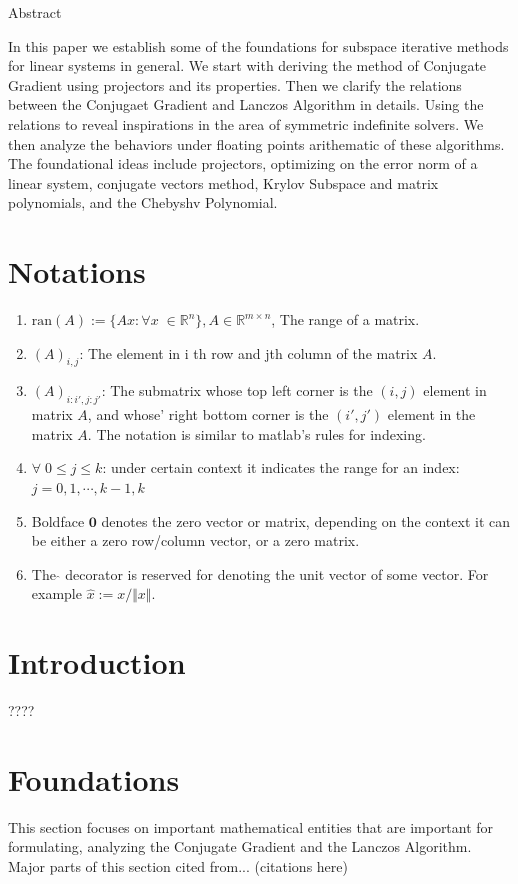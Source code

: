\documentclass[]{article}
\theoremstyle{definition}
\begin{document}
\tableofcontents
\newpage
\begin{center}
    Abstract
\end{center}
In this paper we establish some of the foundations for subspace iterative methods for linear systems in general. We start with deriving the method of Conjugate Gradient using projectors and its properties. Then we clarify the relations between the Conjugaet Gradient and Lanczos Algorithm in details. Using the relations to reveal inspirations in the area of symmetric indefinite solvers. We then analyze the behaviors under floating points arithematic of these algorithms. The foundational ideas include projectors, optimizing on the error norm of a linear system, conjugate vectors method, Krylov Subspace and matrix polynomials, and the Chebyshv Polynomial. 


\section{Notations}
\begin{enumerate}
    \item $\text{ran}(A):=\{Ax :\forall x \; \in \mathbb R^n\}, A \in \mathbb R^{m\times n}$, The range of a matrix. 
    \item $(A)_{i, j}$: The element in i th row and jth column of the matrix $A$.
    \item $(A)_{i:i', j:j'}$: The submatrix whose top left corner is the $(i, j)$ element in matrix $A$, and whose' right bottom corner is the $(i', j ')$ element in the matrix $A$. The notation is similar to matlab's rules for indexing. 
    \item $\forall\; 0\le j \le k$: under certain context it indicates the range for an index: $j = 0, 1, \cdots, k-1, k$
    \item Boldface $\mathbf 0$ denotes the zero vector or matrix, depending on the context it can be either a zero row/column vector, or a zero matrix.
    \item The $\hat{}$ decorator is reserved for denoting the unit vector of some vector. For example $\hat{x}:= x/\Vert x\Vert$. 
\end{enumerate}
\section{Introduction}
    ???? 

\newpage
\section{Foundations}
    This section focuses on important mathematical entities that are important for formulating, analyzing the Conjugate Gradient and the Lanczos Algorithm. Major parts of this section cited from... (citations here)
\end{document}

